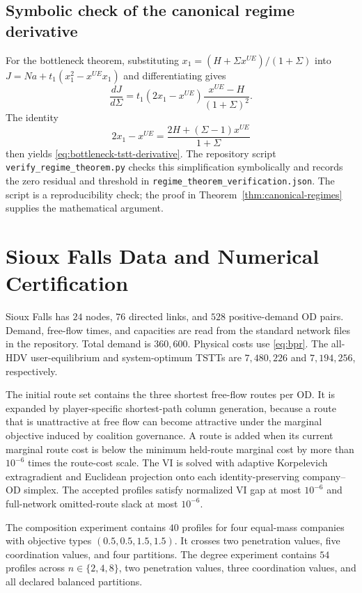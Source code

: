 \subsection{Symbolic check of the canonical regime derivative}

For the bottleneck theorem, substituting
$x_1=(H+\Sigma x^{UE})/(1+\Sigma)$ into
$J=Na+t_1(x_1^2-x^{UE}x_1)$ and differentiating gives
\[
 \frac{dJ}{d\Sigma}
 =t_1(2x_1-x^{UE})\frac{x^{UE}-H}{(1+\Sigma)^2}.
\]
The identity
\[
 2x_1-x^{UE}=\frac{2H+(\Sigma-1)x^{UE}}{1+\Sigma}
\]
then yields \eqref{eq:bottleneck-tstt-derivative}. The repository script
\texttt{verify\_regime\_theorem.py} checks this simplification symbolically
and records the zero residual and threshold in
\texttt{regime\_theorem\_verification.json}. The script is a reproducibility
check; the proof in Theorem~\ref{thm:canonical-regimes} supplies the
mathematical argument.

\section{Sioux Falls Data and Numerical Certification}\label{app:sf-params}

Sioux Falls has $24$ nodes, $76$ directed links, and $528$ positive-demand OD pairs. Demand, free-flow times, and capacities are read from the standard network files in the repository. Total demand is $360{,}600$. Physical costs use \eqref{eq:bpr}. The all-HDV user-equilibrium and system-optimum TSTTs are $7{,}480{,}226$ and $7{,}194{,}256$, respectively.

The initial route set contains the three shortest free-flow routes per OD. It is expanded by player-specific shortest-path column generation, because a route that is unattractive at free flow can become attractive under the marginal objective induced by coalition governance. A route is added when its current marginal route cost is below the minimum held-route marginal cost by more than $10^{-6}$ times the route-cost scale. The VI is solved with adaptive Korpelevich extragradient and Euclidean projection onto each identity-preserving company--OD simplex. The accepted profiles satisfy normalized VI gap at most $10^{-6}$ and full-network omitted-route slack at most $10^{-6}$.

The composition experiment contains $40$ profiles for four equal-mass
companies with objective types $(0.5,0.5,1.5,1.5)$. It crosses two penetration
values, five coordination values, and four partitions. The degree experiment
contains $54$ profiles across $n\in\{2,4,8\}$, two penetration values, three
coordination values, and all declared balanced partitions.

